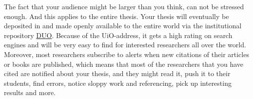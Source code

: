 The fact that your audience might be larger than you think, can not be stressed enough. And this applies to the entire thesis. Your thesis will eventually be deposited in and made openly available to the entire world via the institutional repository \hyperlink{https://duo.uio.no}{DUO}. Because of the UiO-address, it gets a high rating on search engines and will be very easy to find for interested researchers all over the world. Moreover, most researchers subscribe to alerts when new citations of their articles or books are published, which means that most of the researchers that you have cited are notified about your thesis, and they might read it, push it to their students, find errors, notice sloppy work and referencing, pick up interesting results and more.
